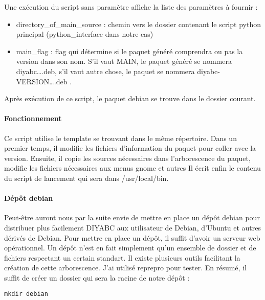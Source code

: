 \documentclass[12pt,a4paper]{article}
\begin{document}
        Une exécution du script sans paramètre affiche la liste des paramètres à fournir :\\

        \begin{itemize}
            \item directory\_of\_main\_source : chemin vers le dossier contenant le script python principal (python\_interface dans notre cas)
            \item main\_flag : flag qui détermine si le paquet généré comprendra ou pas la version dans son nom. S'il vaut MAIN, le paquet généré
                se nommera diyabc\ldots.deb, s'il vaut autre chose, le paquet se nommera diyabc-VERSION\ldots.deb .\\
        \end{itemize}

        Après exécution de ce script, le paquet debian se trouve dans le dossier courant.

        \paragraph{Fonctionnement}
        Ce script utilise le template se trouvant dans le même répertoire. Dans
        un premier temps, il modifie les fichiers d'information du paquet pour
        coller avec la version. Ensuite, il copie les sources nécessaires dans
        l'arborescence du paquet, modifie les fichiers nécessaires aux menus
        gnome et autres Il écrit enfin le contenu du script de lancement qui
        sera dans /usr/local/bin.

        \paragraph{Dépôt debian}
        Peut-être auront nous par la suite envie de mettre en place un dépôt
        debian pour distribuer plus facilement DIYABC aux utilisateur de Debian,
        d'Ubuntu et autres dérivés de Debian. Pour mettre en place un dépôt, il
        suffit d'avoir un serveur web opérationnel. Un dépôt n'est en fait
        simplement qu'un ensemble de dossier et de fichiers respectant un
        certain standart. Il existe plusieurs outils facilitant la création de
        cette arborescence. J'ai utilisé reprepro pour tester. En résumé, il
        suffit de créer un dossier qui sera la racine de notre dépôt :\\

        \begin{verbatim}mkdir debian \end{verbatim}
\end{document}
